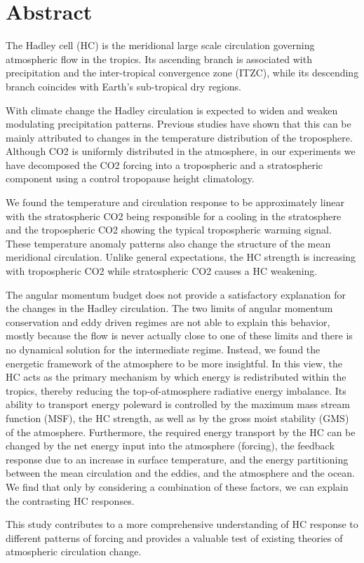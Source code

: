 \chapter*{Abstract}

The Hadley cell (HC) is the meridional large scale circulation governing atmospheric flow in the tropics. Its ascending branch is associated with precipitation and the inter-tropical convergence zone (ITZC), while its descending branch coincides with Earth's sub-tropical dry regions.

With climate change the Hadley circulation is expected to widen and weaken modulating precipitation patterns. Previous studies have shown that this can be mainly attributed to changes in the temperature distribution of the troposphere.
Although CO2 is uniformly distributed in the atmosphere, in our experiments we have decomposed the CO2 forcing into a tropospheric and a stratospheric component using a control tropopause height climatology.

We found the temperature and circulation response to be approximately linear with the stratospheric CO2 being responsible for a cooling in the stratosphere and the tropospheric CO2 showing the typical tropospheric warming signal. These temperature anomaly patterns also change the structure of the mean meridional circulation. Unlike general expectations, the HC strength is increasing with tropospheric CO2 while stratospheric CO2 causes a HC weakening.

The angular momentum budget does not provide a satisfactory explanation for the changes in the Hadley circulation. The two limits of angular momentum conservation and eddy driven regimes are not able to explain this behavior, mostly because the flow is never actually close to one of these limits and there is no dynamical solution for the intermediate regime. Instead, we found the energetic framework of the atmosphere to be more insightful. In this view, the HC acts as the primary mechanism by which energy is redistributed within the tropics, thereby reducing the top-of-atmosphere radiative energy imbalance. Its ability to transport energy poleward is controlled by the maximum mass stream function (MSF), the HC strength, as well as by the gross moist stability (GMS) of the atmosphere.  Furthermore, the required energy transport by the HC can be changed by the net energy input into the atmosphere (forcing), the feedback response due to an increase in surface temperature, and the energy partitioning between the mean circulation and the eddies, and the atmosphere and the ocean. We find that only by considering a combination of these factors, we can explain the contrasting HC responses.

This study contributes to a more comprehensive understanding of HC response to different patterns of forcing and provides a valuable test of existing theories of atmospheric circulation change.
